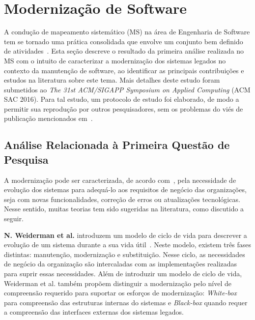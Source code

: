 \section{Modernização de Software}\label{ms}

A condução de mapeamento sistemático (MS) na área de 
Engenharia de Software tem se tornado uma prática 
consolidada que envolve um conjunto bem definido 
de atividades~\cite{Petersen:2008}. Esta seção descreve 
o resultado da primeira análise realizada no MS com o intuito de caracterizar a modernização dos sistemas legados no contexto da manutenção de software, ao identificar 
as principais contribuições e estudos na literatura sobre este tema. Mais detalhes deste estudo foram submetidos ao \textit{The 31st ACM/SIGAPP Symposium on Applied Computing} (ACM SAC 2016). Para tal estudo, um protocolo de estudo foi elaborado, de modo a permitir sua reprodução por outros pesquisadores, sem os problemas do viés de publicação mencionados em~\cite{kitchenham:2004}.

\subsection{An\'{a}lise Relacionada à Primeira Questão de Pesquisa}

A modernização pode ser caracterizada, de acordo com~\cite{S01_bennett2000software, S9_bianchi:2003, S3_Bisbal:1999, S15_Comella-DordaASurvey2000, S2_erlikh:2000}, pela necessidade de evolução dos sistemas para adequá-lo aos requisitos de negócio das organizações, seja com novas funcionalidades, correção de erros ou atualizações tecnológicas. Nesse sentido, muitas teorias tem sido sugeridas na literatura, como discutido a seguir. 

\textbf{N. Weiderman et al.} introduzem um modelo de ciclo de vida 
para descrever a evolução de um sistema durante a sua vida útil~\cite{S15_Comella-DordaASurvey2000, Seacord:2003, S12_WeidermanApproaches:1997}. 
Neste modelo, existem três fases distintas: manutenção, modernização e substituição.  Nesse ciclo, as necessidades de negócio da organização são intercaladas com as implementações realizadas para suprir essas necessidades. 
Além de introduzir um modelo de ciclo de vida, Weiderman et al. também propõem distinguir a modernização pelo nível de compreensão requerido para suportar 
os esforços de modernização: \textit{White-box} para compreensão das estruturas internas do sistemas e \textit{Black-box} quando requer a compreensão das interfaces externas dos sistemas legados.

